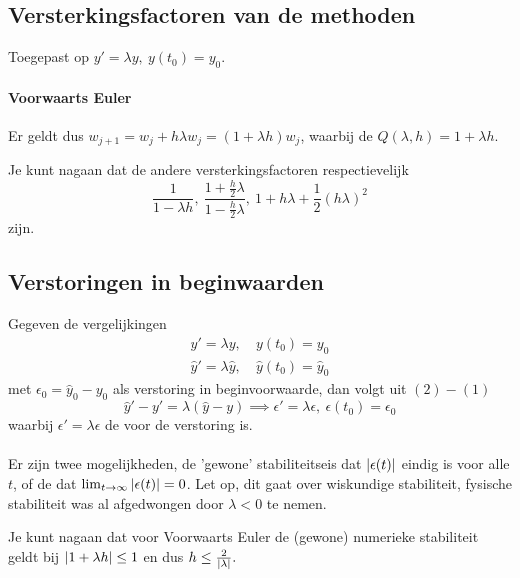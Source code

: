 \documentclass{2wn20summary}
\begin{document}
		\subsection{Versterkingsfactoren van de methoden}
			Toegepast op $y'=\lambda y,\ y(t_0) = y_0$.
			\paragraph{Voorwaarts Euler}
				\begin{define}
				Er geldt dus $w_{j+1} = w_j + h \lambda w_j = (1+\lambda h) w_j$, waarbij de  $Q(\lambda,h) = 1+\lambda h$.
				\end{define}
			Je kunt nagaan dat de andere versterkingsfactoren respectievelijk
			\[
				\frac{1}{1-\lambda h},\ \frac{1+\frac{h}{2}\lambda}{1-\frac{h}{2}\lambda},\ 1+h\lambda + \frac{1}{2} (h\lambda)^2
				\]
				zijn.

		\subsection{Verstoringen in beginwaarden}
			\begin{define}
			Gegeven de vergelijkingen
			\begin{align}
				y'=\lambda y,\ & y(t_0) = y_0 \\
				\hat y' = \lambda \hat y,\ & \hat y (t_0) = \hat y_0
			\end{align}
			met $\epsilon_0 = \hat y_0 - y_0$ als verstoring in beginvoorwaarde, dan volgt uit $(2)-(1)$
			\[
				\hat y' - y'=\lambda (\hat y-y) \implies \epsilon'=\lambda \epsilon,\ \epsilon(t_0) = \epsilon_0
			 \]
			 waarbij $\epsilon'=\lambda \epsilon$ de  voor de verstoring is.
			 \end{define}

			 \paragraph{ }
			 Er zijn twee mogelijkheden, de 'gewone' stabiliteitseis dat $ \abs{\epsilon(t)} $ eindig is voor alle $t$, of de  dat $ \lim_{t\to \infty} \abs{\epsilon(t)} = 0 $. Let op, dit gaat over wiskundige stabiliteit, fysische stabiliteit was al afgedwongen door $\lambda <0$ te nemen.

			 Je kunt nagaan dat voor Voorwaarts Euler de (gewone) numerieke stabiliteit geldt bij $ {\left|1+\lambda h\right|} \le 1 $ en dus $ h \le \frac{2}{{\left|\lambda\right|}}. $
\end{document}
